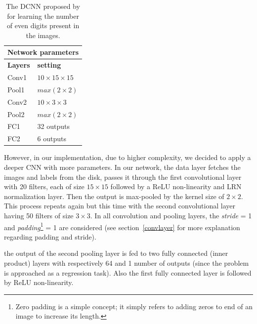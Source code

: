 \begin{table}[H]
	\centering
	\begin{tabular}{ |p{2cm}|p{2cm}| }
	\hline 
	\multicolumn{2}{|c|}{\textbf{Network parameters}} \\
	\hline
	\hline
	\textbf{Layers} & \textbf{setting }\\
	\hline
	Conv1 & $10\times15\times15$\\
	\hline
	Pool1    & $max(2\times2)$ \\
	\hline
	Conv2 & $10\times3\times3$\\
	\hline
	Pool2 &    $max(2\times2)$ \\
	\hline
	FC1 & 32 outputs \\
	\hline
	FC2 & 6 outputs \\
	\hline
	\end{tabular}
		\caption{The DCNN proposed by \cite{segui2015learning} for learning the number of even digits present in the images.}
		\label{santil2c}
\end{table}
 

\noindent However, in our implementation, due to higher complexity, we decided to apply a deeper CNN with more parameters. In our network, the data layer fetches the images and labels from the disk, passes it through the first convolutional layer with 20 filters, each of size $15\times15$ followed by a ReLU non-linearity and LRN normalization layer. Then the output is max-pooled by the  kernel size of $2\times2$. This process repeats again but this time with the second convolutional layer having 50 filters of size $3\times3$. In all convolution and pooling layers, the \textit{stride} = 1 and \textit{padding}\footnote{Zero padding is a simple concept; it simply refers to adding zeros to end of an image to increase its length.} = 1 are considered (see section~\ref{convlayer} for more explanation regarding padding and stride). 

\noindent the output of the second pooling layer is fed to two fully connected (inner product) layers with respectively 64 and 1 number of outputs (since the problem is approached as a regression task). Also the first fully connected layer is followed by ReLU non-linearity. 


